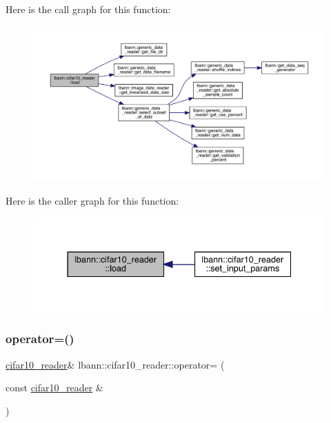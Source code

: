 Here is the call graph for this function\+:\nopagebreak
\begin{figure}[H]
\begin{center}
\leavevmode
\includegraphics[width=350pt]{classlbann_1_1cifar10__reader_aee797d547e651e1b0fd5dedc95edd0e0_cgraph}
\end{center}
\end{figure}
Here is the caller graph for this function\+:\nopagebreak
\begin{figure}[H]
\begin{center}
\leavevmode
\includegraphics[width=337pt]{classlbann_1_1cifar10__reader_aee797d547e651e1b0fd5dedc95edd0e0_icgraph}
\end{center}
\end{figure}
\mbox{\label{classlbann_1_1cifar10__reader_aa97e6d18d0ac3bb42da58c11d5d2ca17}} 
\subsubsection{\texorpdfstring{operator=()}{operator=()}}
{\footnotesize\ttfamily \hyperlink{classlbann_1_1cifar10__reader}{cifar10\+\_\+reader}\& lbann\+::cifar10\+\_\+reader\+::operator= (\begin{DoxyParamCaption}\item[{const \hyperlink{classlbann_1_1cifar10__reader}{cifar10\+\_\+reader} \&}]{ }\end{DoxyParamCaption})\hspace{0.3cm}{\ttfamily [default]}}

